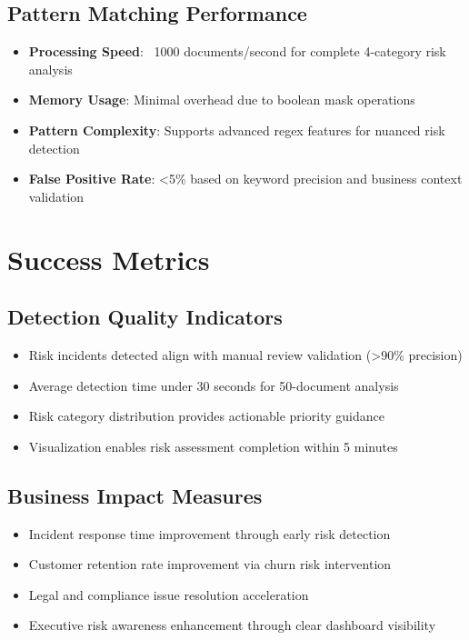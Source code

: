 \documentclass[11pt]{article}
\begin{document}
\subsection{Pattern Matching Performance}
\begin{itemize}
\item \textbf{Processing Speed}: ~1000 documents/second for complete 4-category risk analysis
\item \textbf{Memory Usage}: Minimal overhead due to boolean mask operations
\item \textbf{Pattern Complexity}: Supports advanced regex features for nuanced risk detection
\item \textbf{False Positive Rate}: <5\% based on keyword precision and business context validation
\end{itemize}

\section{Success Metrics}

\subsection{Detection Quality Indicators}
\begin{itemize}
\item Risk incidents detected align with manual review validation (>90\% precision)
\item Average detection time under 30 seconds for 50-document analysis
\item Risk category distribution provides actionable priority guidance
\item Visualization enables risk assessment completion within 5 minutes
\end{itemize}

\subsection{Business Impact Measures}
\begin{itemize}
\item Incident response time improvement through early risk detection
\item Customer retention rate improvement via churn risk intervention
\item Legal and compliance issue resolution acceleration
\item Executive risk awareness enhancement through clear dashboard visibility
\end{itemize}
\end{document}
